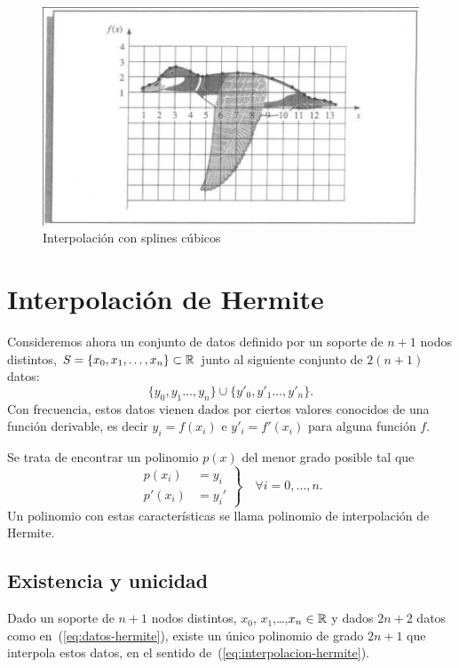 \begin{figure}
  \centering
  \includegraphics[width=0.75\linewidth]{tema2/pato-spline}
  \caption{Interpolación con splines cúbicos}
  \label{fig:pato-spline}
\end{figure}


\section{Interpolación de Hermite}
\label{sec:interp-de-hermite}

Consideremos ahora un conjunto de datos definido por un soporte de
$n+1$ nodos distintos, $S=\{x_0,x_1,\dots,x_n\}\subset \operatorname{{\mathbb R}}$ junto al
siguiente conjunto de $2(n+1)$ datos: 
\begin{equation}
\{y_0,y_1\dots,y_n\} \cup \{y'_0,y'_1\dots,y'_n\}. 
\label{eq:datos-hermite}
\end{equation}
Con frecuencia, estos datos vienen dados por ciertos valores conocidos
de una función derivable, es decir  $y_i=f(x_i)$ e
$y'_i=f'(x_i)$ para alguna función $f$.

Se trata de encontrar un polinomio $p(x)$ del menor grado posible tal
que 
\begin{equation}
  \left.
\begin{aligned}
  p(x_i) &= y_i \\ p'(x_i)&=y_i'
\end{aligned}
\right\}\quad \forall i=0,\dots,n.
\label{eq:interpolacion-hermite}
\end{equation}
Un polinomio con estas características se llama polinomio de
interpolación de Hermite.

\subsection{Existencia y unicidad}
\label{sec:exist-y-unic}

\begin{theorem}
 Dado un soporte de $n+1$ nodos distintos, $x_0$,
 $x_1$,\dots,$x_n\in\operatorname{{\mathbb R}}$ y dados $2n+2$ datos como
 en~(\ref{eq:datos-hermite}), existe un único polinomio de grado
 $2n+1$ que interpola estos datos, en el sentido
 de~(\ref{eq:interpolacion-hermite}).
\end{theorem}

